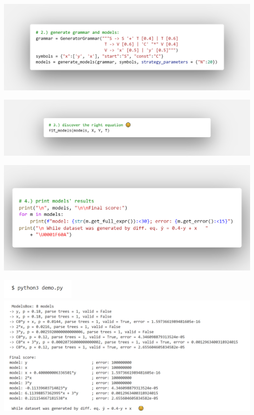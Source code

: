 \documentclass[t,usenames,dvipsnames]{beamer} %
\begin{document}
\begin{frame}
	\includegraphics[width=1.15\paperwidth]
{code-shots/2grammar.png}
\end{frame}
\restoregeometry

\begin{frame}
	\begin{center}
		\includegraphics[width=1.2\paperwidth]
{code-shots/3eqDisco.png}	
	\end{center}
\end{frame}
\restoregeometry

\begin{frame}
\includegraphics[width=1\paperwidth]
{code-shots/4print-models.png}
\end{frame}
\restoregeometry

\begin{frame}[plain]
\includegraphics[height=1cm]
{code-shots/4_1runInTerminal2.png} \pause
\includegraphics[width=\paperwidth]
{code-shots/4_2run-result-edd.png} 
\end{frame}
\restoregeometry
\end{document}
